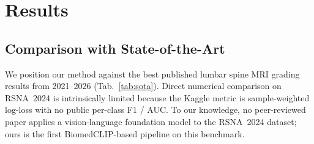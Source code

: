 \section{Results}
\label{sec:results}

\subsection{Comparison with State-of-the-Art}
\label{sec:sota}
We position our method against the best published lumbar spine MRI grading
results from 2021--2026 (Tab.~\ref{tab:sota}). Direct numerical comparison
on RSNA~2024 is intrinsically limited because the Kaggle metric is
sample-weighted log-loss with no public per-class F1 / AUC. To our
knowledge, no peer-reviewed paper applies a vision-language foundation
model to the RSNA~2024 dataset; ours is the first BiomedCLIP-based pipeline
on this benchmark.

